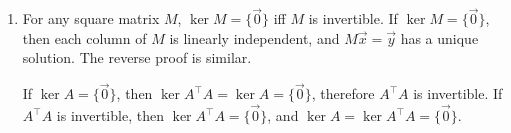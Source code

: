 \documentclass{article}
\begin{document}
\begin{enumerate}[1.]
\begin{enumerate}
\item
For any square matrix $M$, $\ker M = \{\vec{0}\}$ iff $M$ is invertible. If $\ker M = \{\vec{0}\}$, then each column of $M$ is linearly independent, and $M\vec{x} = \vec{y}$ has a unique solution. The reverse proof is similar.

If $\ker A = \{\vec{0}\}$, then $\ker A^{\top}A = \ker A = \{\vec{0}\}$, therefore $A^{\top}A$ is invertible. If $A^{\top}A$ is invertible, then $\ker A^{\top}A = \{\vec{0}\}$, and $\ker A = \ker A^{\top}A = \{\vec{0}\}$. \rQED
\end{enumerate}
\end{enumerate}
\end{document}
